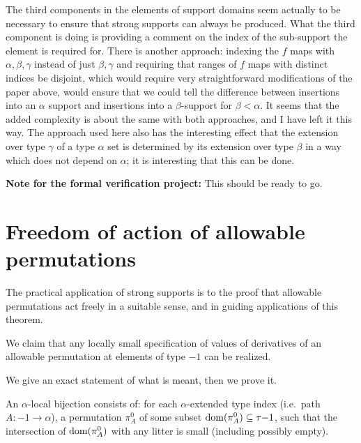 The third components in the elements of support domains seem actually to be necessary to ensure that strong supports can always be produced.  What the third component is doing is providing a comment on the index of the sub-support the element is required for.  There is another approach:  indexing the $f$ maps with $\alpha,\beta,\gamma$ instead of just $\beta,\gamma$ and requiring that ranges of $f$ maps with distinct indices be disjoint, which would require very straightforward modifications of the paper above, would ensure that we could tell the difference between insertions into an $\alpha$ support and insertions into a $\beta$-support for $\beta<\alpha$.  It seems that the added complexity is about the same with both approaches, and I have left it this way.  The approach used here also has the interesting effect that the extension over type $\gamma$ of a type $\alpha$ set is determined by its extension over type $\beta$ in a way which does not depend on $\alpha$;  it is interesting that this can be done.


{\bf Note for the formal verification project:}  This should be ready to go.

\newpage
\section{Freedom of action of allowable permutations}

The practical application of strong supports is to the proof that allowable permutations act freely in a suitable sense, and in guiding applications of this theorem.

We claim that any locally small specification of values of derivatives of an allowable permutation at elements of type $-1$ can be realized.

We give an exact statement of what is meant, then we prove it.

\begin{definition}
\label {def:local-bijection}
\leanok
{}
An $\alpha$-local bijection consists of: for each $\alpha$-extended type index (i.e.\ path $A : -1 \to \alpha$), a permutation $\pi^0_A$ of some subset $\mathrm{dom}(\pi^0_A) \subseteq \tau{-1}$, such that the intersection of $\mathrm{dom}(\pi^0_A)$ with any litter is small (including possibly empty).
\end{definition}

